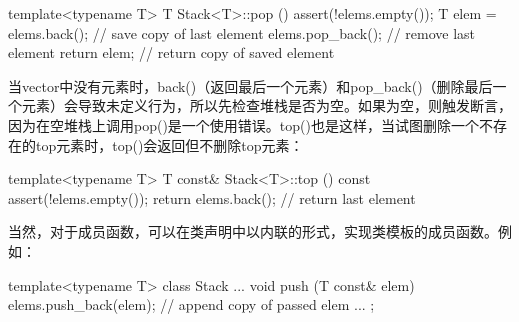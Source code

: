 \begin{cpp}
template<typename T>
T Stack<T>::pop () {
	assert(!elems.empty());
	T elem = elems.back(); // save copy of last element
	elems.pop_back(); // remove last element
	return elem; // return copy of saved element
}
\end{cpp}

当vector中没有元素时，back()（返回最后一个元素）和pop\_back()（删除最后一个元素）会导致未定义行为，所以先检查堆栈是否为空。如果为空，则触发断言，因为在空堆栈上调用pop()是一个使用错误。top()也是这样，当试图删除一个不存在的top元素时，top()会返回但不删除top元素：

\begin{cpp}
template<typename T>
T const& Stack<T>::top () const {
	assert(!elems.empty());
	return elems.back(); // return last element
}
\end{cpp}

当然，对于成员函数，可以在类声明中以内联的形式，实现类模板的成员函数。例如：

\begin{cpp}
template<typename T>
class Stack {
	...
	void push (T const& elem) {
		elems.push_back(elem); // append copy of passed elem
	}
	...
};
\end{cpp}






